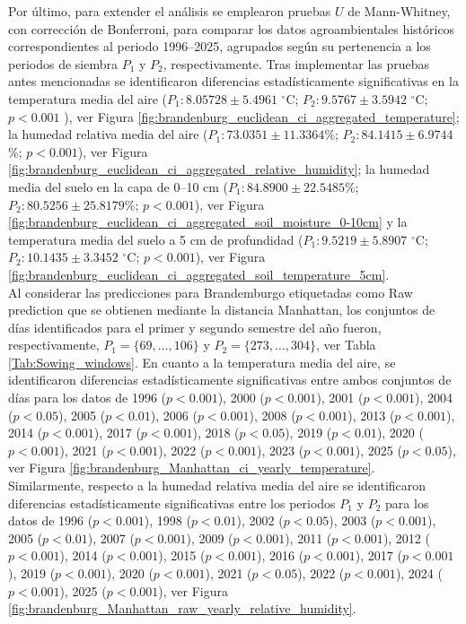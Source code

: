 Por último, para extender el análisis se emplearon pruebas $U$ de Mann-Whitney, con corrección de Bonferroni, para comparar los datos agroambientales históricos correspondientes al periodo 1996--2025, agrupados según su pertenencia a los periodos de siembra $P_1$ y $P_2$, respectivamente.  Tras implementar las pruebas antes mencionadas se identificaron diferencias estadísticamente significativas en la temperatura media del aire ($P_1: 8.05728\pm5.4961$  $^\circ$C; $P_2: 9.5767\pm	3.5942$ $^\circ$C;	$p<0.001$
), ver Figura \ref{fig:brandenburg_euclidean_ci_aggregated_temperature}; la humedad relativa media del aire ($P_1: 73.0351\pm	11.3364$\%; $P_2: 84.1415\pm	6.9744$\%; $p<0.001$), ver Figura \ref{fig:brandenburg_euclidean_ci_aggregated_relative_humidity}; la humedad media del suelo en la capa de 0--10 cm ($P_1: 84.8900\pm	22.5485$\%;	$P_2: 80.5256\pm25.8179$\%;	$p<0.001$), ver Figura \ref{fig:brandenburg_euclidean_ci_aggregated_soil_moisture_0-10cm} y la temperatura media del suelo a 5 cm de profundidad ($P_1:9.5219\pm5.8907$ $^\circ$C; $P_2: 10.1435\pm3.3452$ $^\circ$C; $p<0.001$), ver Figura \ref{fig:brandenburg_euclidean_ci_aggregated_soil_temperature_5cm}.\\

Al considerar las predicciones para Brandemburgo etiquetadas como Raw prediction que se obtienen mediante la distancia Manhattan,  los conjuntos de días identificados para el primer y segundo semestre del año fueron, respectivamente, $P_1=\{69,\ldots, 106\}$ y $P_2=\{273,\ldots,304\}$, ver Tabla \ref{Tab:Sowing_windows}. En cuanto a la temperatura media del aire, se identificaron diferencias estadísticamente significativas entre ambos conjuntos de días para los datos de 1996	($p<0.001$), 2000	($p<0.001$), 2001	($p<0.001$), 2004	($p<0.05$), 2005	($p<0.01$), 2006	($p<0.001$), 2008	($p<0.001$), 2013	($p<0.001$), 2014	($p<0.001$), 2017	($p<0.001$), 2018	($p<0.05$), 2019	($p<0.01$), 2020	($p<0.001$), 2021	($p<0.001$), 2022	($p<0.001$), 2023	($p<0.001$), 2025	($p<0.05$), ver Figura \ref{fig:brandenburg_Manhattan_ci_yearly_temperature}.\\


Similarmente, respecto a la humedad relativa media del aire se identificaron diferencias estadísticamente significativas entre los periodos $P_1$ y $P_2$ para los datos de 1996	($p<0.001$), 1998	($p<0.01$), 2002	($p<0.05$), 2003	($p<0.001$), 2005	($p<0.01$), 2007	($p<0.001$), 2009	($p<0.001$), 2011	($p<0.001$), 2012	($p<0.001$), 2014	($p<0.001$), 2015	($p<0.001$), 2016	($p<0.001$), 2017	($p<0.001$), 2019	($p<0.001$), 2020	($p<0.001$), 2021	($p<0.05$), 2022	($p<0.001$), 2024	($p<0.001$), 2025	($p<0.001$), ver Figura \ref{fig:brandenburg_Manhattan_raw_yearly_relative_humidity}.\\

